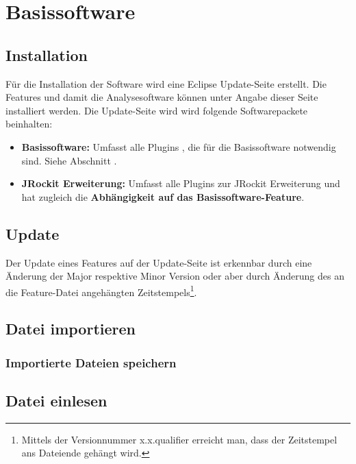 \section{Basissoftware}
\subsection{Installation}
Für die Installation der Software wird eine Eclipse Update-Seite erstellt. Die Features und damit die Analysesoftware können unter Angabe dieser Seite installiert werden. Die Update-Seite wird wird folgende Softwarepackete beinhalten:
\begin{itemize}
\item \textbf{Basissoftware:} Umfasst alle Plugins , die für die Basissoftware notwendig sind. Siehe Abschnitt .
\item \textbf{JRockit Erweiterung: }Umfasst alle Plugins zur JRockit Erweiterung und hat zugleich die \textbf{Abhängigkeit auf das Basissoftware-Feature}.
\end{itemize}

\subsection{Update}
Der Update eines Features auf der Update-Seite ist erkennbar durch eine Änderung der Major respektive Minor Version oder aber durch Änderung des an die Feature-Datei angehängten Zeitstempels\footnote{Mittels der Versionnummer x.x.qualifier erreicht man, dass der Zeitstempel ans Dateiende gehängt wird.}.

\subsection{Datei importieren}


\subsubsection{Importierte Dateien speichern}

\subsection{Datei einlesen}
